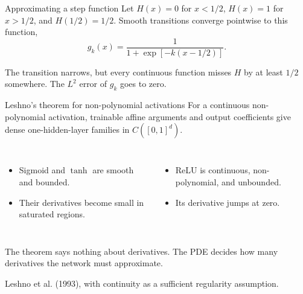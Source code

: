 \documentclass[aspectratio=169]{beamer}
\begin{document}
\begin{frame}{Approximating a step function}
Let $H(x)=0$ for $x<1/2$, $H(x)=1$ for $x>1/2$, and $H(1/2)=1/2$.
Smooth transitions converge pointwise to this function,
\[
g_k(x)=\frac{1}{1+\exp[-k(x-1/2)]}.
\]
\begin{center}
\end{center}
The transition narrows, but every continuous function misses $H$ by at least $1/2$ somewhere.
The $L^2$ error of $g_k$ goes to zero.
\end{frame}

\begin{frame}{Leshno's theorem for non-polynomial activations}
For a continuous non-polynomial activation, trainable affine arguments and output coefficients give dense one-hidden-layer families in $C([0,1]^d)$.
\begin{columns}[T]
\begin{itemize}
\item Sigmoid and $\tanh$ are smooth and bounded.
\item Their derivatives become small in saturated regions.
\end{itemize}
\begin{itemize}
\item ReLU is continuous, non-polynomial, and unbounded.
\item Its derivative jumps at zero.
\end{itemize}
\end{columns}
\medskip
The theorem says nothing about derivatives.
The PDE decides how many derivatives the network must approximate.

{\scriptsize Leshno et al. (1993), with continuity as a sufficient regularity assumption.}
\end{frame}
\end{document}
